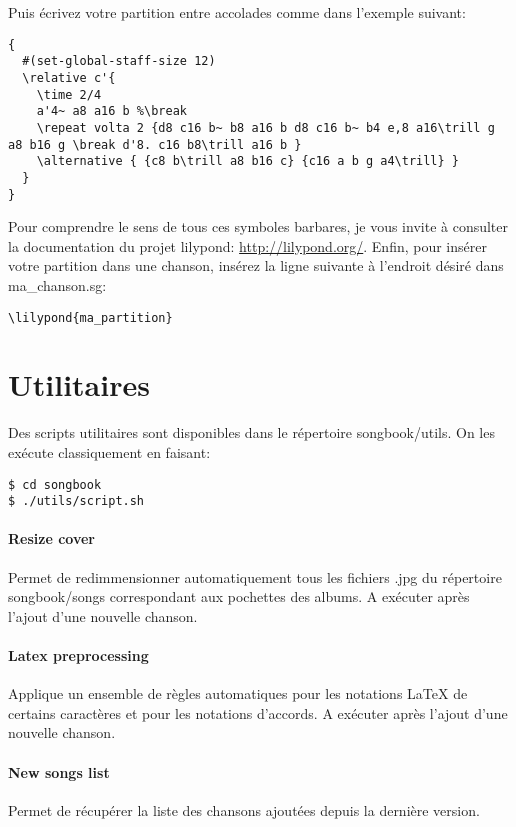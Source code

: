 \documentclass[a4paper,twoside]{article}
\begin{document}
Puis écrivez votre partition entre accolades comme dans l'exemple
suivant:

\begin{verbatim}
{
  #(set-global-staff-size 12)
  \relative c'{
    \time 2/4
    a'4~ a8 a16 b %\break
    \repeat volta 2 {d8 c16 b~ b8 a16 b d8 c16 b~ b4 e,8 a16\trill g a8 b16 g \break d'8. c16 b8\trill a16 b }
    \alternative { {c8 b\trill a8 b16 c} {c16 a b g a4\trill} }
  }
}
\end{verbatim}

Pour comprendre le sens de tous ces symboles barbares, je vous invite
à consulter la documentation du projet lilypond:
\url{http://lilypond.org/}. Enfin, pour insérer votre partition dans
une chanson, insérez la ligne suivante à l'endroit désiré dans
ma\_chanson.sg:

\begin{verbatim}
\lilypond{ma_partition}
\end{verbatim}


\section{Utilitaires}\label{sect:utilitaires}

Des scripts utilitaires sont disponibles dans le répertoire
songbook/utils. On les exécute classiquement en faisant:

\begin{verbatim}
$ cd songbook
$ ./utils/script.sh
\end{verbatim}

\paragraph{Resize cover}
Permet de redimmensionner automatiquement tous les fichiers .jpg du
répertoire songbook/songs correspondant aux pochettes des albums.
A exécuter après l'ajout d'une nouvelle chanson.

\paragraph{Latex preprocessing}
Applique un ensemble de règles automatiques pour les notations LaTeX
de certains caractères et pour les notations d'accords.
A exécuter après l'ajout d'une nouvelle chanson.

\paragraph{New songs list}
Permet de récupérer la liste des chansons ajoutées depuis la dernière
version.
\end{document}

